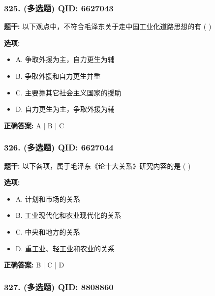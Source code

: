 \documentclass[12pt,UTF8]{ctexart}
\begin{document}
\subsubsection*{325. (多选题) \small QID: 6627043}

\textbf{题干:}
以下观点中，不符合毛泽东关于走中国工业化道路思想的有  ( )

\textbf{选项:}
\begin{itemize}[leftmargin=*]

  \item A. 争取外援为主，自力更生为辅

  \item B. 争取外援和自力更生并重

  \item C. 主要靠其它社会主义国家的援助

  \item D. 自力更生为主，争取外援为辅

\end{itemize}

\textbf{正确答案:}
A | B | C

\vspace{0.3em}\hrulefill\vspace{0.7em}

\subsubsection*{326. (多选题) \small QID: 6627044}

\textbf{题干:}
以下各项，属于毛泽东《论十大关系》研究内容的是  ( )

\textbf{选项:}
\begin{itemize}[leftmargin=*]

  \item A. 计划和市场的关系

  \item B. 工业现代化和农业现代化的关系

  \item C. 中央和地方的关系

  \item D. 重工业、轻工业和农业的关系

\end{itemize}

\textbf{正确答案:}
B | C | D

\vspace{0.3em}\hrulefill\vspace{0.7em}

\subsubsection*{327. (多选题) \small QID: 8808860}
\end{document}
